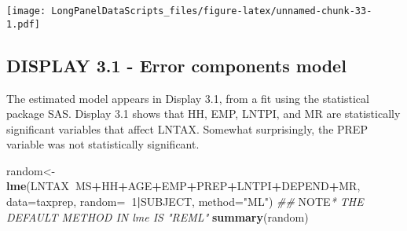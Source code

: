 \documentclass[]{book}
\newenvironment{Shaded}{\begin{snugshade}}{\end{snugshade}}
\newcommand{\AlertTok}[1]{\textcolor[rgb]{0.94,0.16,0.16}{#1}}
\newcommand{\CommentTok}[1]{\textcolor[rgb]{0.56,0.35,0.01}{\textit{#1}}}
\newcommand{\DataTypeTok}[1]{\textcolor[rgb]{0.13,0.29,0.53}{#1}}
\newcommand{\DecValTok}[1]{\textcolor[rgb]{0.00,0.00,0.81}{#1}}
\newcommand{\KeywordTok}[1]{\textcolor[rgb]{0.13,0.29,0.53}{\textbf{#1}}}
\newcommand{\NormalTok}[1]{#1}
\newcommand{\OperatorTok}[1]{\textcolor[rgb]{0.81,0.36,0.00}{\textbf{#1}}}
\newcommand{\StringTok}[1]{\textcolor[rgb]{0.31,0.60,0.02}{#1}}
\begin{document}
\texttt{[image: LongPanelDataScripts\_files/figure-latex/unnamed-chunk-33-1.pdf]}

\hypertarget{display-3.1---error-components-model}{%
\subsection{DISPLAY 3.1 - Error components model}\label{display-3.1---error-components-model}}

The estimated model appears in Display 3.1, from a fit using the statistical package SAS. Display 3.1 shows that HH, EMP, LNTPI, and MR are statistically significant variables that affect LNTAX. Somewhat surprisingly, the PREP variable was not statistically significant.

\begin{Shaded}
\begin{Highlighting}[]
\NormalTok{random<-}\KeywordTok{lme}\NormalTok{(LNTAX}\OperatorTok{~}\NormalTok{MS}\OperatorTok{+}\NormalTok{HH}\OperatorTok{+}\NormalTok{AGE}\OperatorTok{+}\NormalTok{EMP}\OperatorTok{+}\NormalTok{PREP}\OperatorTok{+}\NormalTok{LNTPI}\OperatorTok{+}\NormalTok{DEPEND}\OperatorTok{+}\NormalTok{MR, }\DataTypeTok{data=}\NormalTok{taxprep, }\DataTypeTok{random=}\OperatorTok{~}\DecValTok{1}\OperatorTok{|}\NormalTok{SUBJECT, }\DataTypeTok{method=}\StringTok{"ML"}\NormalTok{)}
\CommentTok{## }\AlertTok{NOTE}\CommentTok{* THE DEFAULT METHOD IN lme IS "REML"}
\KeywordTok{summary}\NormalTok{(random)}
\end{Highlighting}
\end{Shaded}
\end{document}
